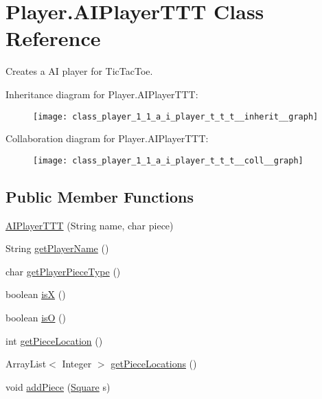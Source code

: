 \hypertarget{class_player_1_1_a_i_player_t_t_t}{}\section{Player.\+A\+I\+Player\+T\+T\+T Class Reference}
\label{class_player_1_1_a_i_player_t_t_t}


Creates a A\+I player for Tic\+Tac\+Toe.  




Inheritance diagram for Player.\+A\+I\+Player\+T\+T\+T\+:
\nopagebreak
\begin{figure}[H]
\begin{center}
\leavevmode
\texttt{[image: class\_player\_1\_1\_a\_i\_player\_t\_t\_t\_\_inherit\_\_graph]}
\end{center}
\end{figure}


Collaboration diagram for Player.\+A\+I\+Player\+T\+T\+T\+:
\nopagebreak
\begin{figure}[H]
\begin{center}
\leavevmode
\texttt{[image: class\_player\_1\_1\_a\_i\_player\_t\_t\_t\_\_coll\_\_graph]}
\end{center}
\end{figure}
\subsection*{Public Member Functions}
\begin{DoxyCompactItemize}
\item 
\hyperlink{class_player_1_1_a_i_player_t_t_t_ae14ec8ce7a73f91b999f61b3682d4d2a}{A\+I\+Player\+T\+T\+T} (String name, char piece)
\item 
String \hyperlink{class_player_1_1_a_i_player_t_t_t_aacc073468526cff79faa6ed3ab1ab58f}{get\+Player\+Name} ()
\item 
char \hyperlink{class_player_1_1_a_i_player_t_t_t_a9e15cc9460330e6c70e8b8f8b1ad420c}{get\+Player\+Piece\+Type} ()
\item 
boolean \hyperlink{class_player_1_1_a_i_player_t_t_t_af22521a88989d915f9942c05136c0138}{is\+X} ()
\item 
boolean \hyperlink{class_player_1_1_a_i_player_t_t_t_a46635ecc04b552870b7932c075abb83c}{is\+O} ()
\item 
int \hyperlink{class_player_1_1_a_i_player_t_t_t_a720325103f04baf7e91f74f38aae2dee}{get\+Piece\+Location} ()
\item 
Array\+List$<$ Integer $>$ \hyperlink{class_player_1_1_a_i_player_t_t_t_a134185b132dcb9caec6293b9e4c6f66f}{get\+Piece\+Locations} ()
\item 
void \hyperlink{class_player_1_1_a_i_player_t_t_t_a1892cf5a0820045fb9658892af0b1ea7}{add\+Piece} (\hyperlink{class_square_1_1_square}{Square} s)
\end{DoxyCompactItemize}
